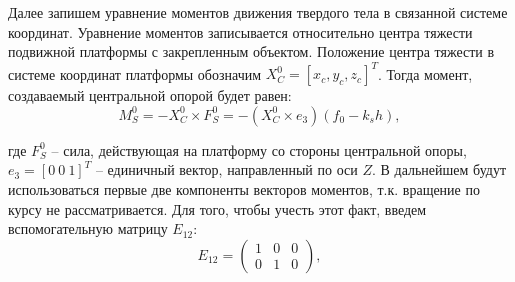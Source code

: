 Далее запишем уравнение моментов движения твердого тела в связанной системе координат. Уравнение моментов записывается относительно центра тяжести подвижной платформы с закрепленным объектом. Положение центра тяжести в системе координат платформы обозначим $X^0_C = \left[x_c, y_c, z_c\right]^T$. Тогда момент, создаваемый центральной опорой будет равен:
\begin{equation}
\label{eq:TorqueFromCentralSupport}
M_S^0 = -X_C^0 \times F_S^0 = -\left(X_C^0 \times e_3\right)\left(f_0 - k_sh\right),
\end{equation}

где $F^0_S$ – сила, действующая на платформу со стороны центральной опоры, $e_3 = \left[0~0~1\right]^T$ -- единичный вектор, направленный по оси $Z$. В дальнейшем будут использоваться первые две компоненты векторов моментов, т.к. вращение по курсу не рассматривается. Для того, чтобы учесть этот факт, введем вспомогательную матрицу $E_{12}$:
\begin{equation}
\label{eq:AuxiliaryUnitMatrix}
E_{12} = \begin{pmatrix}
1 & 0 & 0 \\
0 & 1 & 0
\end{pmatrix},
\end{equation}

